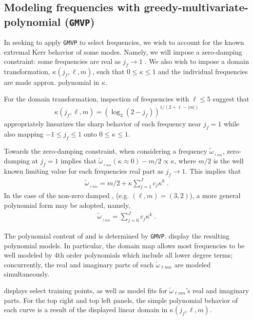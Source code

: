 \documentclass[twocolumn,aps,prd,floatfix,preprintnumbers,a4paper,nofootinbib,
superscriptaddress,10pt]{revtex4-1}
\newcommand{\cw}{\tilde{\omega}}
\def\jf{j_f}
\def\lmn{_{\ell m n}}
\def\gmvp#1{greedy-multivariate-polynomial#1
  (\texttt{GMVP}#1)\gdef\gmvp{\texttt{GMVP}}}
\begin{document}
\subsection{Modeling \qnm{} frequencies with \gmvp{}}
%
%
%
In seeking to apply \gmvp{} to select \qnm{} frequencies, we wish to account for the known extremal Kerr behavior of some modes.
%
Namely, we will impose a zero-damping constraint: some frequencies are real as $\jf \rightarrow 1$ \cite{Zimmerman:2015trm}.
%
We also wish to impose a domain transformation, $\kappa(\jf,\ell,m)$, such that $0 \leq \kappa \leq 1$ and the individual \qnm{} frequencies are made approx. polynomial in $\kappa$.
%
\par For the domain transformation, inspection of \qnm{} frequencies with $\ell \leq 5$ suggest that
%
\begin{align}
  \label{eq:kappa}
  \kappa(\jf,\ell,m) = \left( \log_3( 2 - \jf ) \right)^{1/(2+\ell-|m|)}
\end{align}
%
appropriately linearizes the sharp behavior of each frequency near $\jf=1$ while also mapping $-1 \le \jf \le 1$ onto $0 \le \kappa \le 1$.
%
\par Towards the zero-damping constraint, when considering a \qnm{} frequency $\cw_{\lmn}$, zero-damping at $\jf=1$ implies that $\cw_{\lmn}(\kappa \approx 0)-m/2 \propto \kappa$, where $m/2$ is the well known limiting value for each \qnm{} frequencies real part as $\jf\rightarrow 1$.
%
This implies that
%
\begin{align}
  \label{eq:zd}
  \cw_{\lmn} = m/2 + \kappa \sum_{j=1}^{J} c_j \kappa^k \; .
\end{align}
%
In the case of the non-zero damped , (e.g. $(\ell,m)=(3,2)$), a more general polynomial form may be adopted, namely,
%
\begin{align}
  \label{eq:nzd}
  \cw_{\lmn} = \sum_{j=0}^{J} c_j \kappa^k \; .
\end{align}
%
\par The polynomial content of  and  is determined by \gmvp{}.
%
 display the resulting polynomial models.
%
In particular, the domain map allows most \qnm{} frequencies to be well modeled by 4th order polynomials which include all lower degree terms; concurrently, the real and imaginary parts of each $\cw\lmn$ are modeled simultaneously.
%
\par {} displays select training points, as well as model fits for $\cw\lmn$'s real and imaginary parts.
%
For the top right and top left panels, the simple polynomial behavior of each curve is a result of the displayed linear domain in $\kappa(\jf,\ell,m)$.
\end{document}
